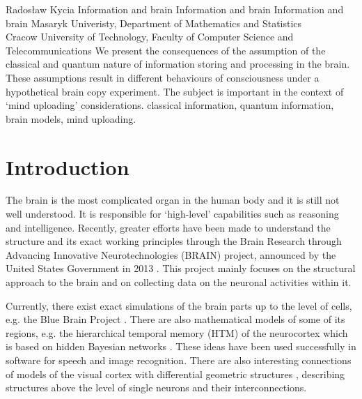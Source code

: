 \begin{artengenv}{Radosław Kycia}
	{Information and brain}
	{Information and brain}
	{Information and brain}
	{Masaryk Univeristy, Department of Mathematics and Statistics\\
	Cracow University of Technology, Faculty of Computer Science and Telecommunications\label{kycia_anfang}}
	{We present the consequences of the assumption of the classical and quantum nature of information storing and processing in the brain. These assumptions result in different behaviours of consciousness under a hypothetical brain copy experiment. The subject is important in the context of `mind uploading' considerations.}
	{classical information, quantum information, brain models, mind uploading.}
	
	


\section{Introduction}
\lettrine[loversize=0.13,lines=2,lraise=-0.03,nindent=0em,findent=0.2pt]%
{T}{}he brain is the most complicated organ in the human body and it is still not well understood. It is responsible for `high-level' capabilities such as reasoning and intelligence. Recently, greater efforts have been made to understand the structure and its exact working principles through the Brain Research through Advancing Innovative Neurotechnologies (BRAIN) project, announced by the United States Government in 2013 \parencite{BRAINInitiative}. This project mainly focuses on the structural approach to the brain and on collecting data on the neuronal activities within it.

Currently, there exist exact simulations of the brain parts up to the level of cells, e.g. the Blue Brain Project \parencite{BlueBrainProject}. There are also mathematical models of some of its regions, e.g. the hierarchical temporal memory (HTM) of the neurocortex \parencite{CortexModel1, CortexModel2} which is based on hidden Bayesian networks \parencite{KurzweilHowToCreateBrain}. These ideas have been used successfully in software for speech and image recognition. There are also interesting connections of models of the visual cortex with differential geometric structures \parencite{VisualCortex}, describing structures above the level of single neurons and their interconnections.


\end{artengenv}
